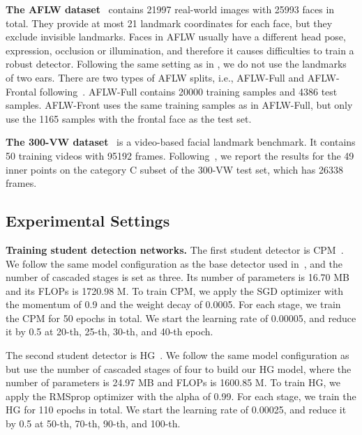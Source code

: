 \documentclass[10pt,twocolumn,letterpaper]{article}
\begin{document}
\textbf{The AFLW dataset}~\cite{koestinger2011annotated} contains 21997 real-world images with 25993 faces in total.
They provide at most 21 landmark coordinates for each face, but they exclude invisible landmarks.
Faces in AFLW usually have a different head pose, expression, occlusion or illumination, and therefore it causes difficulties to train a robust detector.
Following the same setting as in \cite{lv2017deep,zhu2016unconstrained}, we do not use the landmarks of two ears.
There are two types of AFLW splits, i.e., AFLW-Full and AFLW-Frontal following~\cite{zhu2016unconstrained,dong2018san}.
AFLW-Full contains 20000 training samples and 4386 test samples.
AFLW-Front uses the same training samples as in AFLW-Full, but only use the 1165 samples with the frontal face as the test set.






\textbf{The 300-VW dataset}~\cite{shen2015first} is a video-based facial landmark benchmark. It contains 50 training videos with 95192 frames. Following~\cite{khan2017synergy,dong2018sbr}, we report the results for the 49 inner points on the category C subset of the 300-VW test set, which has 26338 frames.



\subsection{Experimental Settings}\label{sec:setting}


\textbf{Training student detection networks.}
The first student detector is CPM~\cite{wei2016convolutional}.
We follow the same model configuration as the base detector used in~\cite{wei2016convolutional,dong2018san}, and the number of cascaded stages is set as three.
Its number of parameters is 16.70 MB and its FLOPs is 1720.98 M.
To train CPM, we apply the SGD optimizer with the momentum of 0.9 and the weight decay of 0.0005.
For each stage, we train the CPM for 50 epochs in total.
We start the learning rate of 0.00005, and reduce it by 0.5 at 20-th, 25-th, 30-th, and 40-th epoch.

The second student detector is HG~\cite{newell2016stacked}.
We follow the same model configuration as~\cite{bulat2017far} but use the number of cascaded stages of four to build our HG model, where the number of parameters is 24.97 MB and FLOPs is 1600.85 M.
To train HG, we apply the RMSprop optimizer with the alpha of 0.99.
For each stage, we train the HG for 110 epochs in total.
We start the learning rate of 0.00025, and reduce it by 0.5 at 50-th, 70-th, 90-th, and 100-th.
\end{document}
